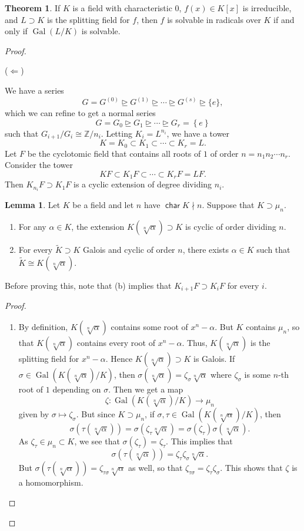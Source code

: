 \documentclass[10pt,letterpaper,cm]{nupset}
\theoremstyle{definition}
\theoremstyle{theorem}
\newtheorem{theorem}[definition]{Theorem}
\newtheorem{lemma}[definition]{Lemma}
\theoremstyle{remark}
\newcommand{\Z}{\mathbb Z}
\newcommand{\1}{\mathbf{1}}
\newcommand{\0}{\vec 0}
\DeclareMathOperator{\Char}{\mathsf{char}}
\DeclareMathOperator{\gal}{Gal}
\begin{document}
\begin{theorem}
If $K$ is a field with characteristic $0$, $f(x) \in K[x]$ is irreducible, and $L \supset K$ is the splitting field for $f$, then  $f$ is solvable in radicals over $K$ if and only if $\gal(L/K)$ is solvable. 
\end{theorem}
\begin{proof} $ $


($\Longleftarrow$) 

We have a series $$ G = G^{(0)} \unrhd G^{(1)} \unrhd \cdots \unrhd G^{(s)} \unrhd \{e\} ,$$ which we can refine to get a normal series $$  G=G_0 \unrhd G_1 \unrhd \cdots \unrhd G_r = \left\{e\right\}  $$ such that $G_{i+1}/G_i \cong \Z/n_i$. Letting $K_i = L^{n_i}$, we have a tower $$ K= K_0 \subset K_1 \subset \cdots \subset K_r = L  .$$ Let $F$ be the cyclotomic field that contains all roots of $1$ of order $n= n_1n_2 \cdots n_r$. Consider the tower $$KF \subset K_1F \subset \cdots \subset K_r F = LF.$$  Then $K_{n_i}F \supset K_1F$ is a cyclic extension of degree dividing $n_i$.
\begin{lemma}
Let $K$ be a field and let $n$ have $\Char{K} \nmid n$. Suppose that $K \supset \mu_n$.
\begin{enumerate}[label=(\alph*)]
\item For any $\alpha \in K$, the extension $K(\sqrt[n]{\alpha}) \supset K$  is cyclic of order dividing $n$.
\item For every $\widetilde{K} \supset K$ Galois and cyclic of order $n$, there exists $\alpha \in K$ such that $\widetilde{K} \cong K(\sqrt[n]{\alpha})$.
\end{enumerate}
\end{lemma}
Before proving this, note that (b) implies that $K_{i+1}F \supset K_iF$ for every $i$.
\begin{proof} $ $
\begin{enumerate}[label=(\alph*)]
\item By definition, $K(\sqrt[n]{\alpha})$ contains some root of $x^n - \alpha$. But $K$ contains $\mu_n$, so that $K(\sqrt[n]{\alpha})$ contains every root of $x^n - \alpha$. Thus, $K(\sqrt[n]{\alpha})$ is the splitting field for $x^n - \alpha$. Hence $K(\sqrt[n]{\alpha}) \supset K$ is Galois.
 If $\sigma \in \gal(K(\sqrt[n]{\alpha}) / K)$, then $ \sigma(\sqrt[n]{\alpha}) = \zeta_{\sigma} \sqrt[n]{\alpha}$ where $ \zeta_{\sigma}$ is  some  $n$-th root of $1$ depending on  $\sigma$. Then we get a map $$\zeta : \gal(K(\sqrt[n]{\alpha})/K) \to \mu_n$$ given by $ \sigma \mapsto \zeta_{\sigma}$. But since $K \supset \mu_n$, if $\sigma, \tau \in \gal(K(\sqrt[n]{\alpha})/K)$, then $$\sigma(\tau(\sqrt[n]{\alpha})) = \sigma(\zeta_{\tau}\sqrt[n]{\alpha})= \sigma(\zeta_{\tau})\sigma(\sqrt[n]{\alpha}).$$ As $\zeta_{\tau} \in \mu_n \subset K$, we see that $\sigma(\zeta_{\tau}) = \zeta_{\tau}$. This implies that $$ \sigma(\tau(\sqrt[n]{\alpha})) =  \zeta_{\tau}\zeta_{\sigma}\sqrt[n]{\alpha} .$$ But $\sigma(\tau(\sqrt[n]{\alpha})) = \zeta_{\tau \sigma}\sqrt[n]{\alpha}$ as well, so that $\zeta_{\tau \sigma} = \zeta_{\tau} \zeta_{\sigma}$. This shows that $\zeta$ is a homomorphism. 
 

\end{enumerate}
\end{proof}
\end{proof}
\end{document}
